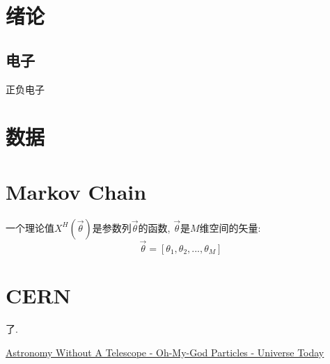 \documentclass[a4paper]{article}
\begin{document}
\begin{spacing}{1.5}
{}
\setcounter{page}{1}


\section{绪论}

\subsection{电子}
正负电子



\pagebreak[4]%


\section{数据}



\pagebreak[4]%
\appendix
\section{Markov Chain}
一个理论值$X^H(\vec{\theta})$是参数列$\vec{\theta}$的函数, $\vec{\theta}$是$M$维空间的矢量:
\begin{equation}
\vec{\theta}=[\theta_1, \theta_2, ..., \theta_M]
\end{equation}



\pagebreak[4]%


\section{CERN}
了.


\end{spacing}


\pagebreak[4]
\begin{thebibliography}{99}


 \href{https://www.universetoday.com/86490/astronomy-without-a-telescope-oh-my-god-particles/}{Astronomy Without A Telescope - Oh-My-God Particles - Universe Today}


\end{thebibliography}
\end{document}
